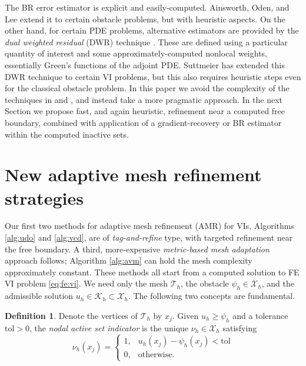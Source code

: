 \documentclass[]{interact}
\theoremstyle{plain}%
\theoremstyle{definition}
\newtheorem{definition}[theorem]{Definition}
\theoremstyle{remark}
\newcommand{\cK}{\mathcal{K}}
\newcommand{\cT}{\mathcal{T}}
\newcommand{\cX}{\mathcal{X}}
\begin{document}
The BR error estimator is explicit and easily-computed.  Ainsworth, Oden, and Lee \cite{AinsworthOdenLee1993} extend it to certain obstacle problems, but with heuristic aspects.  On the other hand, for certain PDE problems, alternative estimators are provided by the \emph{dual weighted residual} (DWR) technique \cite{BangerthRannacher2003}.  These are defined using a particular quantity of interest and some approximately-computed nonlocal weights, essentially Green's functions of the adjoint PDE.  Suttmeier \cite{Suttmeier2008} has extended this DWR technique to certain VI problems, but this also requires heuristic steps even for the classical obstacle problem.  In this paper we avoid the complexity of the techniques in \cite{AinsworthOdenLee1993} and \cite{Suttmeier2008}, and instead take a more pragmatic approach.  In the next Section we propose fast, and again heuristic, refinement near a computed free boundary, combined with application of a gradient-recovery or BR estimator within the computed inactive sets.


\section{New adaptive mesh refinement strategies} \label{sec:viamr}

Our first two methods for adaptive mesh refinement (AMR) for VIs, Algorithms \ref{alg:udo} and \ref{alg:vcd}, are of \emph{tag-and-refine} type, with targeted refinement near the free boundary.  A third, more-expensive \emph{metric-based mesh adaptation} approach \cite{Wallworketal2020} follows; Algorithm \ref{alg:avm} can hold the mesh complexity approximately constant.  These methods all start from a computed solution to FE VI problem \eqref{eq:fe:vi}.  We need only the mesh $\cT_h$, the obstacle $\psi_h \in \cX_h$, and the admissible solution $u_h \in \cK_h \subset \cX_h$.  The following two concepts are fundamental.

\begin{definition} \label{def:nodalactive}
Denote the vertices of $\cT_h$ by $x_j$.  Given $u_h \ge \psi_h$ and a tolerance $\text{tol}>0$, the \emph{nodal active set indicator} is the unique $\nu_h\in\cX_h$ satisfying
	$$\nu_h(x_j) = \begin{cases} 1, & u_h(x_j) - \psi_h(x_j) < \text{tol} \\
	                             0, & \text{otherwise.}\end{cases}$$
\end{definition}
\end{document}
